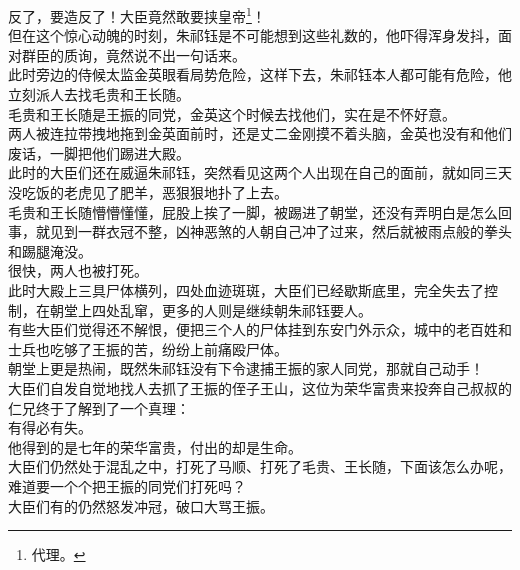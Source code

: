 \begin{multicols}{\theparacolNo}
反了，要造反了！大臣竟然敢要挟皇帝\footnote{代理。}！\\

但在这个惊心动魄的时刻，朱祁钰是不可能想到这些礼数的，他吓得浑身发抖，面对群臣的质询，竟然说不出一句话来。\\

此时旁边的侍候太监金英眼看局势危险，这样下去，朱祁钰本人都可能有危险，他立刻派人去找毛贵和王长随。\\

毛贵和王长随是王振的同党，金英这个时候去找他们，实在是不怀好意。\\

两人被连拉带拽地拖到金英面前时，还是丈二金刚摸不着头脑，金英也没有和他们废话，一脚把他们踢进大殿。\\

此时的大臣们还在威逼朱祁钰，突然看见这两个人出现在自己的面前，就如同三天没吃饭的老虎见了肥羊，恶狠狠地扑了上去。\\

毛贵和王长随懵懵懂懂，屁股上挨了一脚，被踢进了朝堂，还没有弄明白是怎么回事，就见到一群衣冠不整，凶神恶煞的人朝自己冲了过来，然后就被雨点般的拳头和踢腿淹没。\\

很快，两人也被打死。\\

此时大殿上三具尸体横列，四处血迹斑斑，大臣们已经歇斯底里，完全失去了控制，在朝堂上四处乱窜，更多的人则是继续朝朱祁钰要人。\\

有些大臣们觉得还不解恨，便把三个人的尸体挂到东安门外示众，城中的老百姓和士兵也吃够了王振的苦，纷纷上前痛殴尸体。\\

朝堂上更是热闹，既然朱祁钰没有下令逮捕王振的家人同党，那就自己动手！\\

大臣们自发自觉地找人去抓了王振的侄子王山，这位为荣华富贵来投奔自己叔叔的仁兄终于了解到了一个真理：\\

有得必有失。\\

他得到的是七年的荣华富贵，付出的却是生命。\\

大臣们仍然处于混乱之中，打死了马顺、打死了毛贵、王长随，下面该怎么办呢，难道要一个个把王振的同党们打死吗？\\

大臣们有的仍然怒发冲冠，破口大骂王振。\\


\end{multicols}
